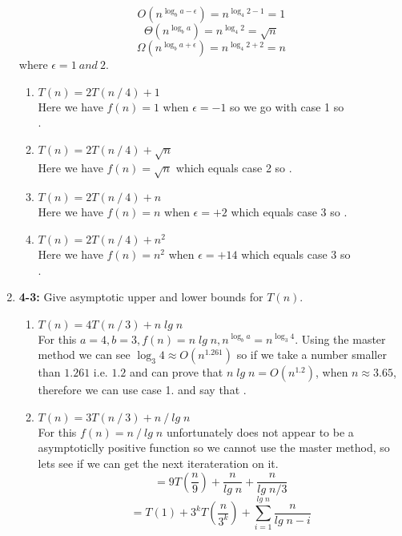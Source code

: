 \documentclass{article}
\begin{document}
\begin{enumerate}
    \[O(n^{\log_b a-\epsilon}) = n^{\log_4 2-1} = 1\]
    \[\Theta(n^{\log_b a}) = n^{\log_4 2} = \sqrt{n}\] 
    \[\Omega(n^{\log_b a+\epsilon}) = n^{\log_4 2+2} = n\]
    where $\epsilon = 1\:and\:2$.
    \begin{enumerate}
      \itemsep1em 
      \item $T(n) = 2T(n \mathbin{/} 4) + 1$ \\
      Here we have $f(n) = 1$ when $\epsilon = -1$ so we go with case 1 so \\ .
      \item $T(n) = 2T(n \mathbin{/} 4) + \sqrt{n}$ \\
      Here we have $f(n) = \sqrt{n}$ which equals case 2 so .
      \item $T(n) = 2T(n \mathbin{/} 4) + n$ \\
      Here we have $f(n) = n$ when $\epsilon = +2$ which equals case 3 so . 
      \item $T(n) = 2T(n \mathbin{/} 4) + n^2$ \\
      Here we have $f(n) = n^2$ when $\epsilon = +14$ which equals case 3 so \\ .
    \end{enumerate}

    \item \textbf{4-3:} Give asymptotic upper and lower bounds for $T(n)$.
    \begin{enumerate}
      \itemsep1em 
      \item $T(n) = 4T(n \mathbin{/} 3) + n\;lg\;n$ \\
      For this $a = 4, b = 3, f(n) = n\;lg\;n, n^{\log_b a} = n^{\log_3 4}$. Using the master method we can see $\log_3 4 \approx O(n^{1.261})$ 
      so if we take a number smaller than $1.261$ i.e. $1.2$ and can prove that $n\;lg\;n = O(n^{1.2})$, when $n \approx 3.65$, therefore we can use case 1.
      and say that .

      \item $T(n) = 3T(n \mathbin{/} 3) + n \mathbin{/} lg\;n$ \\
      For this $f(n) = n \mathbin{/} lg\;n$ unfortunately does not appear to be a asymptoticlly positive function so we cannot use the master method, so lets see if we can get the next iterateration on it.\\
      \[= 9T(\frac{n}{9}) + \frac{n}{lg\;n} + \frac{n}{lg\;n/3}\]
      \[= T(1) + 3^kT(\frac{n}{3^k}) + \sum_{i=1}^{lg\;n}\frac{n}{lg\;n-i}\]


\end{enumerate}
\end{enumerate}
\end{document}
